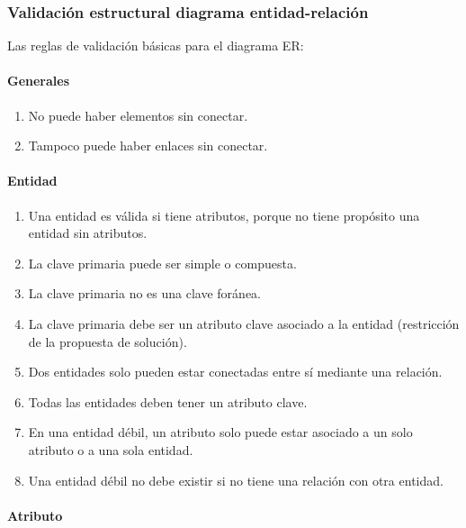\subsubsection{Validación estructural diagrama entidad-relación}

Las reglas de validación básicas para el diagrama ER:

\paragraph*{Generales}
\begin{enumerate}
    \item No puede haber elementos sin conectar.
    \item Tampoco puede haber enlaces sin conectar.
\end{enumerate}


\paragraph*{Entidad}
\begin{enumerate}
    \item Una entidad es válida si tiene atributos, porque no tiene propósito una entidad sin atributos.
    \item La clave primaria puede ser simple o compuesta.
    \item La clave primaria no es una clave foránea.
    \item La clave primaria debe ser un atributo clave asociado a la entidad (restricción de la propuesta de solución).
    \item Dos entidades solo pueden estar conectadas entre sí mediante una relación.
    \item Todas las entidades deben tener un atributo clave.
    \item En una entidad débil, un atributo solo puede estar asociado a un solo atributo o a una sola entidad.
    \item Una entidad débil no debe existir si no tiene una relación con otra entidad.
\end{enumerate}

\paragraph*{Atributo}

